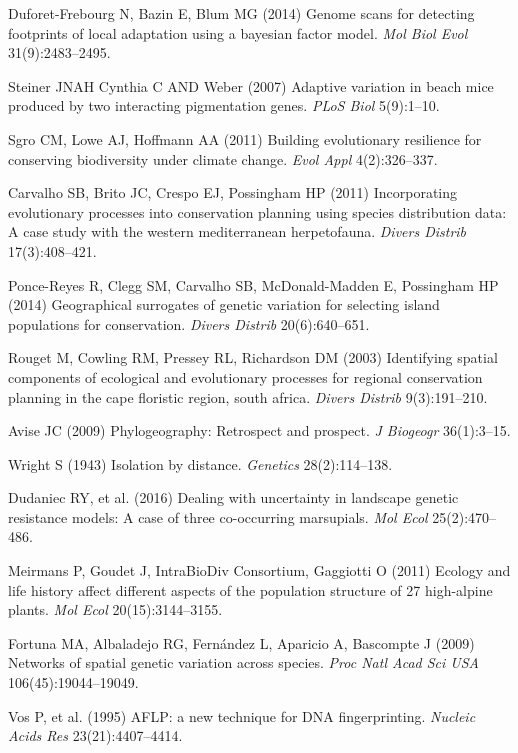 \documentclass[9pt,twocolumn,twoside,lineno]{pnas-new}
\begin{document}
\begin{thebibliography}{100}
Duforet-Frebourg N, Bazin E, Blum MG (2014) Genome scans for
detecting footprints of local adaptation using a bayesian factor model.
\emph{Mol Biol Evol} 31(9):2483--2495.

Steiner JNAH Cynthia C AND Weber (2007) Adaptive variation in beach
mice produced by two interacting pigmentation genes. \emph{PLoS Biol}
5(9):1--10.

Sgro CM, Lowe AJ, Hoffmann AA (2011) Building evolutionary
resilience for conserving biodiversity under climate change. \emph{Evol
Appl} 4(2):326--337.

Carvalho SB, Brito JC, Crespo EJ, Possingham HP (2011) Incorporating
evolutionary processes into conservation planning using species
distribution data: A case study with the western mediterranean
herpetofauna. \emph{Divers Distrib} 17(3):408--421.

Ponce-Reyes R, Clegg SM, Carvalho SB, McDonald-Madden E, Possingham
HP (2014) Geographical surrogates of genetic variation for selecting
island populations for conservation. \emph{Divers Distrib}
20(6):640--651.

Rouget M, Cowling RM, Pressey RL, Richardson DM (2003) Identifying
spatial components of ecological and evolutionary processes for regional
conservation planning in the cape floristic region, south africa.
\emph{Divers Distrib} 9(3):191--210.

Avise JC (2009) Phylogeography: Retrospect and prospect. \emph{J
Biogeogr} 36(1):3--15.

Wright S (1943) Isolation by distance. \emph{Genetics}
28(2):114--138.

Dudaniec RY, et al. (2016) Dealing with uncertainty in landscape
genetic resistance models: A case of three co-occurring marsupials.
\emph{Mol Ecol} 25(2):470--486.

Meirmans P, Goudet J, IntraBioDiv Consortium, Gaggiotti O (2011)
Ecology and life history affect different aspects of the population
structure of 27 high-alpine plants. \emph{Mol Ecol} 20(15):3144--3155.

Fortuna MA, Albaladejo RG, Fernández L, Aparicio A, Bascompte J
(2009) Networks of spatial genetic variation across species. \emph{Proc
Natl Acad Sci USA} 106(45):19044--19049.

Vos P, et al. (1995) AFLP: a new technique for DNA fingerprinting.
\emph{Nucleic Acids Res} 23(21):4407--4414.


\end{thebibliography}
\end{document}
